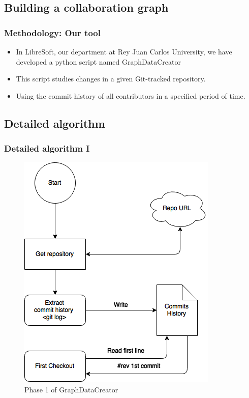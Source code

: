 \documentclass{beamer}
\begin{document}
\subsection{Building a collaboration graph}
\begin{frame}
\frametitle{Methodology: Our tool}
\begin{itemize}
\item In LibreSoft, our department at Rey Juan Carlos University,
we have developed a python script named GraphDataCreator 
\item This script studies changes in a given 
Git-tracked repository.
\item Using the commit history of all contributors in a specified period of time.
\end{itemize}
\end{frame}

\subsection{Detailed algorithm}

\begin{frame}
\frametitle{Detailed algorithm I}
\begin{figure}
\includegraphics[scale=0.3]{GDCphase1.png} 
\caption{Phase 1 of GraphDataCreator}
\label{fig:phase1}
\end{figure}
\end{frame}
\end{document}
